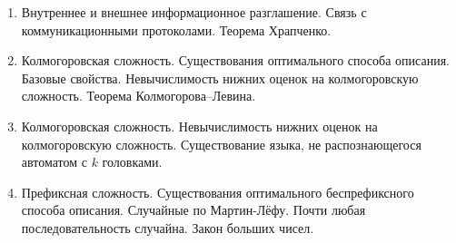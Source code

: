\begin{enumerate}
    \item Внутреннее и внешнее информационное разглашение. Связь с коммуникационными протоколами.
        Теорема Храпченко.
    \item Колмогоровская сложность. Существования оптимального способа описания. Базовые
        свойства. Невычислимость нижних оценок на колмогоровскую сложность. Теорема Колмогорова--Левина.
    \item Колмогоровская сложность. Невычислимость нижних оценок на колмогоровскую
        сложность. Существование языка, не распознающегося автоматом с $k$ головками.
    \item Префиксная сложность. Существования оптимального беспрефиксного способа описания.
        Случайные по Мартин-Лёфу. Почти любая последовательность случайна. Закон больших чисел.
\end{enumerate}





